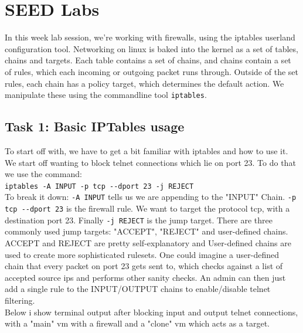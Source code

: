 \documentclass{article}
\begin{document}
\newpage
\section{SEED Labs}
In this week lab session, we're working with firewalls, using the iptables userland
configuration tool. Networking on linux is baked into the kernel as a set of tables,
chains and targets. Each table contains a set of chains, and chains contain a set
of rules, which each incoming or outgoing packet runs through. Outside of the set
rules, each chain has a policy target, which determines the default action. We
manipulate these using the commandline tool \verb!iptables!.\\
\subsection{Task 1: Basic IPTables usage}
To start off with, we have to get a bit familiar with iptables and how to use it. We
start off wanting to block telnet connections which lie on port 23. To do that we
use the command:\\
\verb!iptables -A INPUT -p tcp --dport 23 -j REJECT!\\
To break it down: \verb!-A INPUT! tells us we are appending to the "INPUT" Chain.
\verb!-p tcp --dport 23! is the firewall rule. We want to target the protocol tcp,
with a destination port 23. Finally \verb!-j REJECT! is the jump target. There are
three commonly used jump targets: "ACCEPT", "REJECT" and user-defined chains. ACCEPT
and REJECT are pretty self-explanatory and User-defined chains are used to create
more sophisticated rulesets. One could imagine a user-defined chain that every
packet on port 23 gets sent to, which checks against a list of accepted source ips
and performs other sanity checks. An admin can then just add a single rule to the
INPUT/OUTPUT chains to enable/disable telnet filtering.\\
Below i show terminal output after blocking input and output telnet connections,
with a "main" vm with a firewall and a "clone" vm which acts as a target.
\end{document}
